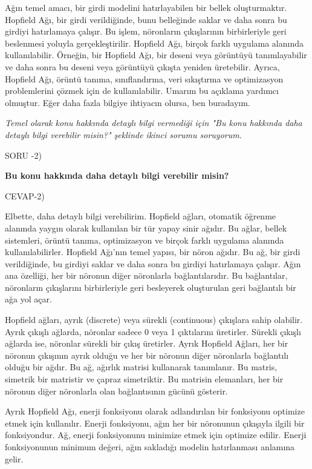 \documentclass[11pt]{article}
\begin{document}
Ağın temel amacı, bir girdi modelini hatırlayabilen bir bellek oluşturmaktır. Hopfield Ağı, bir girdi verildiğinde, bunu belleğinde saklar ve daha sonra bu girdiyi hatırlamaya çalışır. Bu işlem, nöronların çıkışlarının birbirleriyle geri beslenmesi yoluyla gerçekleştirilir.
Hopfield Ağı, birçok farklı uygulama alanında kullanılabilir. Örneğin, bir Hopfield Ağı, bir deseni veya görüntüyü tanımlayabilir ve daha sonra bu deseni veya görüntüyü çıkışta yeniden üretebilir. Ayrıca, Hopfield Ağı, örüntü tanıma, sınıflandırma, veri sıkıştırma ve optimizasyon problemlerini çözmek için de kullanılabilir.
Umarım bu açıklama yardımcı olmuştur. Eğer daha fazla bilgiye ihtiyacın olursa, ben buradayım.

\textit{Temel olarak konu hakkında detaylı bilgi vermediği için "Bu konu hakkında daha detaylı bilgi verebilir misin?" şeklinde ikinci sorumu soruyorum.}

SORU -2)

\textbf{Bu konu hakkında daha detaylı bilgi verebilir misin?}

CEVAP-2)

Elbette, daha detaylı bilgi verebilirim.
Hopfield ağları, otomatik öğrenme alanında yaygın olarak kullanılan bir tür yapay sinir ağıdır. Bu ağlar, bellek sistemleri, örüntü tanıma, optimizasyon ve birçok farklı uygulama alanında kullanılabilirler.
Hopfield Ağı'nın temel yapısı, bir nöron ağıdır. Bu ağ, bir girdi verildiğinde, bu girdiyi saklar ve daha sonra bu girdiyi hatırlamaya çalışır. Ağın ana özelliği, her bir nöronun diğer nöronlarla bağlantılarıdır. Bu bağlantılar, nöronların çıkışlarını birbirleriyle geri besleyerek oluşturulan geri bağlantılı bir ağa yol açar.

Hopfield ağları, ayrık (discrete) veya sürekli (continuous) çıkışlara sahip olabilir. Ayrık çıkışlı ağlarda, nöronlar sadece 0 veya 1 çıktılarını üretirler. Sürekli çıkışlı ağlarda ise, nöronlar sürekli bir çıkış üretirler.
Ayrık Hopfield Ağları, her bir nöronun çıkışının ayrık olduğu ve her bir nöronun diğer nöronlarla bağlantılı olduğu bir ağdır. Bu ağ, ağırlık matrisi kullanarak tanımlanır. Bu matris, simetrik bir matristir ve çapraz simetriktir. Bu matrisin elemanları, her bir nöronun diğer nöronlarla olan bağlantısının gücünü gösterir.

Ayrık Hopfield Ağı, enerji fonksiyonu olarak adlandırılan bir fonksiyonu optimize etmek için kullanılır. Enerji fonksiyonu, ağın her bir nöronunun çıkışıyla ilgili bir fonksiyondur. Ağ, enerji fonksiyonunu minimize etmek için optimize edilir. Enerji fonksiyonunun minimum değeri, ağın sakladığı modelin hatırlanması anlamına gelir.
\end{document}
